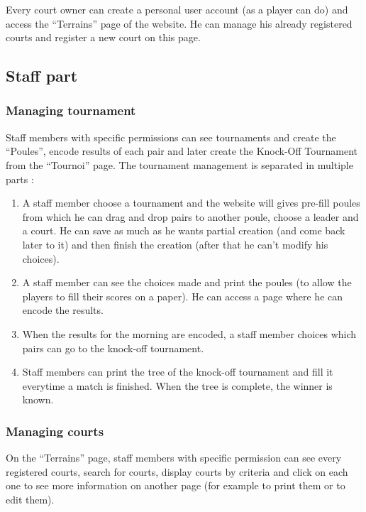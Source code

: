 Every court owner can create a personal user account (as a player can do) and access the \enquote{Terrains} page of the website. He can manage his already registered courts and register a new court on this page.

\subsection{Staff part}

\subsubsection{Managing tournament}

Staff members with specific permissions can see tournaments and create the \enquote{Poules}, encode results of each pair and later create the Knock-Off Tournament from the \enquote{Tournoi} page. The tournament management is separated in multiple parts :

\begin{enumerate}
    \item A staff member choose a tournament and the website will gives pre-fill poules from which he can drag and drop pairs to another poule, choose a leader and a court. He can save as much as he wants partial creation (and come back later to it) and then finish the creation (after that he can't modify his choices).
    \item A staff member can see the choices made and print the poules (to allow the players to fill their scores on a paper). He can access a page where he can encode the results.
    \item When the results for the morning are encoded, a staff member choices which pairs can go to the knock-off tournament.
    \item Staff members can print the tree of the knock-off tournament and fill it everytime a match is finished. When the tree is complete, the winner is known.
\end{enumerate}

\subsubsection{Managing courts}

On the \enquote{Terrains} page, staff members with specific permission can see every registered courts, search for courts, display courts by criteria and click on each one to see more information on another page (for example to print them or to edit them).

